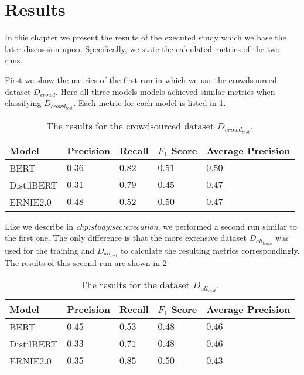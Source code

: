 \section{Results}
\label{chp:study:sec:results}
In this chapter we present the results of the executed study which we base the later discussion upon.
Specifically, we state the calculated metrics of the two runs.

First we show the metrics of the first run in which we use the crowdsourced dataset $D_{crowd}$.
Here all three models models achieved similar metrics when classifying $D_{crowd_{test}}$.
Each metric for each model is listed in \cref{tab:study:results:first_run}.
\begin{table}[htpb]
    \centering
    \begin{tabular}{l l l l l }
        \toprule
         Model & Precision & Recall & $F_1$ Score & Average Precision \\
        \midrule
        \ac{BERT} & $0.36$ & $0.82$ & $0.51$ & $0.50$\\
        \ac{DistilBERT} & $0.31$ & $0.79$ & $0.45$ & $0.47$\\
        \ac{ERNIE2.0} & $0.48$ & $0.52$ & $0.50$ & $0.47$\\
        \bottomrule
    \end{tabular}
    \caption[Study Results on Crowdsourced Dataset]{The results for the crowdsourced dataset $D_{crowd_{test}}$.}\label{tab:study:results:first_run}
\end{table}

Like we describe in \textit{chp:study:sec:execution}, we performed a second run similar to the first one.
The only difference is that the more extensive dataset $D_{all_{train}}$ was used for the training and $D_{all_{test}}$ to calculate the resulting metrics correspondingly.
The results of this second run are shown in \cref{tab:study:results:second_run}.
\begin{table}[htpb]
    \centering
    \begin{tabular}{l l l l l }
        \toprule
         Model & Precision & Recall & $F_1$ Score & Average Precision\\
        \midrule
        \ac{BERT} & $0.45$ & $0.53$ & $0.48$ & $0.46$\\
        \ac{DistilBERT} & $0.33$ & $0.71$ & $0.48$ & $0.46$\\
        \ac{ERNIE2.0} & $0.35$ & $0.85$ & $0.50$ & $0.43$\\
        \bottomrule
    \end{tabular}
    \caption[Study Results on Complete Dataset]{The results for the dataset $D_{all_{test}}$.}\label{tab:study:results:second_run}
\end{table}
